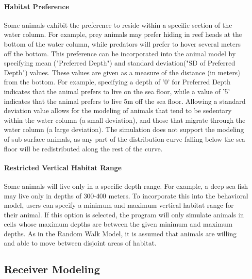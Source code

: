 \paragraph{Habitat Preference}
\label{habitatPref}
Some animals exhibit the preference to reside within a specific section of the water column.  For example, prey animals may prefer hiding in reef heads at the bottom of the water column, while predators will prefer to hover several meters off the bottom.  This preference can be incorporated into the animal model by specifying mean ("Preferred Depth") and standard deviation("SD of Preferred Depth") values.  These values are given as a measure of the distance (in meters) from the bottom.  For example, specifying a depth of '0' for Preferred Depth indicates that the animal prefers to live on the sea floor, while a value of '5' indicates that the animal prefers to live 5m off the sea floor.  Allowing a standard deviation value allows for the modeling of animals that tend to be sedentary within the water column (a small deviation), and those that migrate through the water column (a large deviation).  The simulation does not support the modeling of sub-surface animals, as any part of the distribution curve falling below the sea floor will be redistributed along the rest of the curve. 


\paragraph{Restricted Vertical Habitat Range}
\label{restrictedVerticalHabitat}
Some animals will live only in a specific depth range.  For example, a deep sea fish may live only in depths of 300-400 meters.  To incorporate this into the behavioral model, users can specify a minimum and maximum vertical habitat range for their animal.  If this option is selected, the program will only simulate animals in cells whose maximum depths are between the given minimum and maximum depths.  As in the Random Walk Model, it is assumed that animals are willing and able to move between disjoint areas of habitat.


\subsection{Receiver Modeling}
\label{receiverModel}


